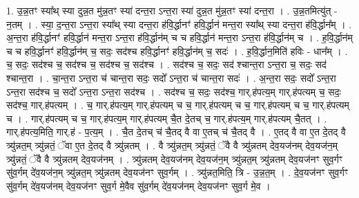 \documentclass[17pt]{extarticle}
\begin{document}
1. उ॒न्न॒तꣳ स्या᳚थ् स्या दुन्न॒त मु॑न्न॒तꣳ स्या॑ दन्त॒रा ऽन्त॒रा स्या॑ दुन्न॒त मु॑न्न॒तꣳ स्या॑ दन्त॒रा । . उ॒न्न॒तमित्यु॑त् - न॒तम् । . स्या॒ द॒न्त॒रा ऽन्त॒रा स्या᳚थ् स्या दन्त॒रा ह॑वि॒र्द्धानꣳ॑ हवि॒र्द्धान॑ मन्त॒रा स्या᳚थ् स्या दन्त॒रा ह॑वि॒र्द्धान᳚म् । . अ॒न्त॒रा ह॑वि॒र्द्धानꣳ॑ हवि॒र्द्धान॑ मन्त॒रा ऽन्त॒रा ह॑वि॒र्द्धान॑म् च च हवि॒र्द्धान॑ मन्त॒रा ऽन्त॒रा ह॑वि॒र्द्धान॑म् च । . ह॒वि॒र्द्धान॑म् च च हवि॒र्द्धानꣳ॑ हवि॒र्द्धान॑म् च॒ सदः॒ सद॑श्च हवि॒र्द्धानꣳ॑ हवि॒र्द्धान॑म् च॒ सदः॑ । . ह॒वि॒र्द्धान॒मिति॑ हविः - धान᳚म् । . च॒ सदः॒ सद॑श्च च॒ सद॑श्च च॒ सद॑श्च च॒ सद॑श्च । . सद॑श्च च॒ सदः॒ सद॑ श्चान्त॒रा ऽन्त॒रा च॒ सदः॒ सद॑ श्चान्त॒रा । . चा॒न्त॒रा ऽन्त॒रा च॑ चान्त॒रा सदः॒ सदो᳚ ऽन्त॒रा च॑ चान्त॒रा सदः॑ । . अ॒न्त॒रा सदः॒ सदो᳚ ऽन्त॒रा ऽन्त॒रा सद॑श्च च॒ सदो᳚ ऽन्त॒रा ऽन्त॒रा सद॑श्च । . सद॑श्च च॒ सदः॒ सद॑श्च॒ गार्.ह॑पत्य॒म् गार्.ह॑पत्यम् च॒ सदः॒ सद॑श्च॒ गार्.ह॑पत्यम् । . च॒ गार्.ह॑पत्य॒म् गार्.ह॑पत्यम् च च॒ गार्.ह॑पत्यम् च च॒ गार्.ह॑पत्यम् च च॒ गार्.ह॑पत्यम् च । . गार्.ह॑पत्यम् च च॒ गार्.ह॑पत्य॒म् गार्.ह॑पत्यम् चै॒त दे॒तच् च॒ गार्.ह॑पत्य॒म् गार्.ह॑पत्यम् चै॒तत् । . गार्.ह॑पत्य॒मिति॒ गार्.ह॑ - प॒त्य॒म् । . चै॒त दे॒तच् च॑ चै॒तद् वै वा ए॒तच् च॑ चै॒तद् वै । . ए॒तद् वै वा ए॒त दे॒तद् वै त्र्यु॑न्नत॒म् त्र्यु॑न्नतं॒ ॅवा ए॒त दे॒तद् वै त्र्यु॑न्नतम् । . वै त्र्यु॑न्नत॒म् त्र्यु॑न्नतं॒ ॅवै वै त्र्यु॑न्नतम् देव॒यज॑नम् देव॒यज॑न॒म् त्र्यु॑न्नतं॒ ॅवै वै त्र्यु॑न्नतम् देव॒यज॑नम् । . त्र्यु॑न्नतम् देव॒यज॑नम् देव॒यज॑न॒म् त्र्यु॑न्नत॒म् त्र्यु॑न्नतम् देव॒यज॑नꣳ सुव॒र्गꣳ सु॑व॒र्गम् दे॑व॒यज॑न॒म् त्र्यु॑न्नत॒म् त्र्यु॑न्नतम् देव॒यज॑नꣳ सुव॒र्गम् । . त्र्यु॑न्नत॒मिति॒ त्रि - उ॒न्न॒त॒म् । . दे॒व॒यज॑नꣳ सुव॒र्गꣳ सु॑व॒र्गम् दे॑व॒यज॑नम् देव॒यज॑नꣳ सुव॒र्ग मे॒वैव सु॑व॒र्गम् दे॑व॒यज॑नम् देव॒यज॑नꣳ सुव॒र्ग मे॒व । \newline
\end{document}
